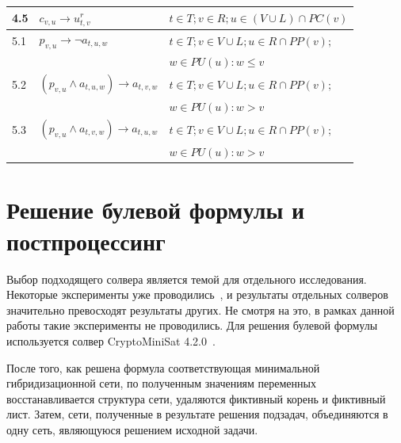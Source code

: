 \begin{table}[t]
\begin{tabular}{l | l | l}
  4.5 &
  $c_{v,u} \rightarrow u^r_{t,v}$ &
  $t \in T; v \in R; u \in \left(V \cup L\right) \cap PC(v)$
  \\

  \hline
  5.1 &
  $p_{v,u} \rightarrow \neg a_{t,u,w}$ &
  $t \in T; v \in V \cup L; u \in R \cap PP(v);$
  \\ & & \quad$w \in PU(u): w \leq v$
  \\
  
  5.2 &
  $(p_{v,u} \wedge a_{t,u,w}) \rightarrow a_{t,v,w}$ &
  $t \in T; v \in V \cup L; u \in R \cap PP(v);$
  \\ & & \quad$w \in PU(u): w > v$
  \\
  
  5.3 &
  $(p_{v,u} \wedge a_{t,v,w}) \rightarrow a_{t,u,w}$ &
  $t \in T; v \in V \cup L; u \in R \cap PP(v);$
  \\ & & \quad$w \in PU(u): w > v$
  \\

\end{tabular}
\label{child-parent-table}
\end{table}

\FloatBarrier
\section{Решение булевой формулы и постпроцессинг}

Выбор подходящего солвера является темой для отдельного исследования. Некоторые эксперименты уже проводились~\cite{bonet2009efficiently}, и результаты отдельных солверов значительно превосходят результаты других. Не смотря на это, в рамках данной работы такие эксперименты не проводились. Для решения булевой формулы используется солвер CryptoMiniSat 4.2.0~\cite{cryptominisat}.

После того, как решена формула соответствующая минимальной гибридизационной сети, по полученным значениям переменных восстанавливается структура сети, удаляются фиктивный корень и фиктивный лист.
Затем, сети, полученные в результате решения подзадач, объединяются в одну сеть, являющуюся решением исходной задачи.